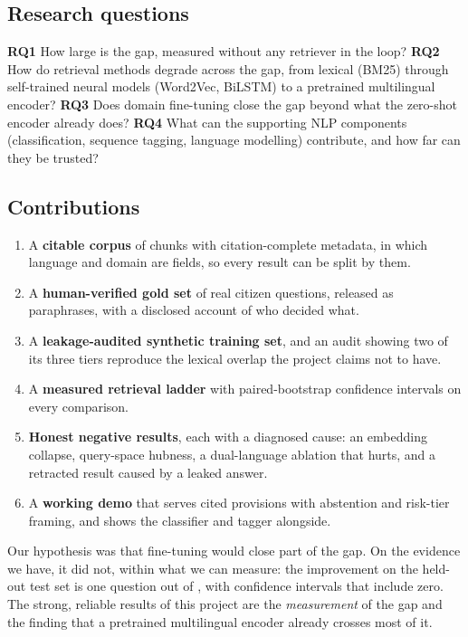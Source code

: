 \documentclass[10pt,a4paper]{article}
\begin{document}
\subsection{Research questions}
\textbf{RQ1} How large is the gap, measured without any retriever in the loop? \textbf{RQ2} How do retrieval methods degrade across the gap, from lexical (BM25) through self-trained neural models (Word2Vec, BiLSTM) to a pretrained multilingual encoder? \textbf{RQ3} Does domain fine-tuning close the gap beyond what the zero-shot encoder already does? \textbf{RQ4} What can the supporting NLP components (classification, sequence tagging, language modelling) contribute, and how far can they be trusted?

\subsection{Contributions}
\begin{enumerate}
\item A \textbf{citable corpus} of \nChunks{} chunks with citation-complete metadata, in which language and domain are fields, so every result can be split by them.
\item A \textbf{human-verified gold set} of \nGold{} real citizen questions, released as paraphrases, with a disclosed account of who decided what.
\item A \textbf{leakage-audited synthetic training set}, and an audit showing two of its three tiers reproduce the lexical overlap the project claims not to have.
\item A \textbf{measured retrieval ladder} with paired-bootstrap confidence intervals on every comparison.
\item \textbf{Honest negative results}, each with a diagnosed cause: an embedding collapse, query-space hubness, a dual-language ablation that hurts, and a retracted result caused by a leaked answer.
\item A \textbf{working demo} that serves cited provisions with abstention and risk-tier framing, and shows the classifier and tagger alongside.
\end{enumerate}

\begin{finding}
Our hypothesis was that fine-tuning would close part of the gap. On the evidence we have, it did not, within what we can measure: the improvement on the held-out test set is one question out of \nTest, with confidence intervals that include zero. The strong, reliable results of this project are the \emph{measurement} of the gap and the finding that a pretrained multilingual encoder already crosses most of it.
\end{finding}
\end{document}
